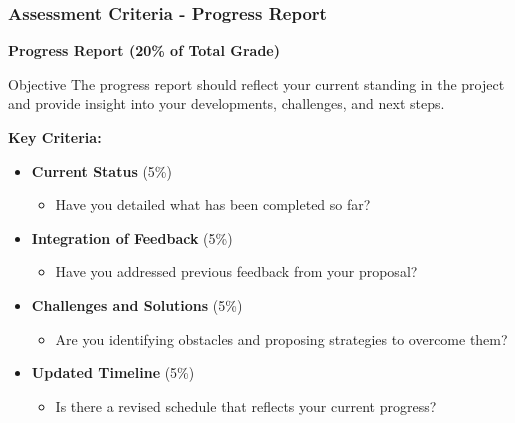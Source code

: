 \documentclass[aspectratio=169]{beamer}
\begin{document}
\begin{frame}[fragile]
    \frametitle{Assessment Criteria - Progress Report}
    \textbf{Progress Report (20\% of Total Grade)}

    \begin{block}{Objective}
        The progress report should reflect your current standing in the project and provide insight into your developments, challenges, and next steps.
    \end{block}

    \textbf{Key Criteria:}
    \begin{itemize}
        \item \textbf{Current Status} (5\%)
        \begin{itemize}
            \item Have you detailed what has been completed so far?
        \end{itemize}
        \item \textbf{Integration of Feedback} (5\%)
        \begin{itemize}
            \item Have you addressed previous feedback from your proposal?
        \end{itemize}
        \item \textbf{Challenges and Solutions} (5\%)
        \begin{itemize}
            \item Are you identifying obstacles and proposing strategies to overcome them?
        \end{itemize}
        \item \textbf{Updated Timeline} (5\%)
        \begin{itemize}
            \item Is there a revised schedule that reflects your current progress?
        \end{itemize}
    \end{itemize}
\end{frame}
\end{document}
